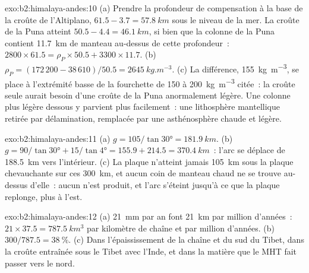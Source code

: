 \begin{solution}{exo:b2:himalaya-andes:10}
(a) Prendre la profondeur de compensation à la
base de la croûte de l'Altiplano, $61.5 - 3.7 =
\qty{57.8}{km}$ sous le niveau de la mer. La croûte de la Puna atteint $50.5 - 4.4 = \qty{46.1}{km}$, si bien
que la colonne de la Puna contient \qty{11.7}{km} de manteau au-dessus de cette profondeur~: $2800\times61.5 =
\rho_P\times50.5 + 3300\times11.7$. (b) $\rho_P = (172\,200 - 38\,610)/50.5 =
\qty{2645}{kg.m^{-3}}$. (c) La différence, \qty{155}{kg.m^{-3}}, se place à l'extrémité basse de la fourchette de 150 à
\qty{200}{kg.m^{-3}} citée~: la croûte seule aurait besoin d'une croûte de la Puna anormalement légère. Une colonne plus légère dessous y
parvient plus facilement~: une lithosphère mantellique retirée par délamination, remplacée par une asthénosphère chaude et légère.
\end{solution}

\begin{solution}{exo:b2:himalaya-andes:11}
(a) $g = 105/\tan\ang{30} = \qty{181.9}{km}$. (b) $g = 90/\tan\ang{30} + 15/\tan\ang{4} =
155.9 + 214.5 = \qty{370.4}{km}$~: l'arc se déplace de \qty{188.5}{km} vers l'intérieur. (c) La plaque n'atteint
jamais \qty{105}{km} sous la plaque chevauchante sur ces \qty{300}{km}, et aucun coin de manteau chaud ne se trouve
au-dessus d'elle~: aucun  n'est produit, et l'arc s'éteint jusqu'à ce que la plaque replonge, plus à l'est.
\end{solution}

\begin{solution}{exo:b2:himalaya-andes:12}
(a) \qty{21}{mm} par an font \qty{21}{km} par million d'années~: $21\times37.5 =
\qty{787.5}{km^3}$ par kilomètre de chaîne et par million d'années. (b) $300/787.5 =
\qty{38}{\percent}$. (c) Dans l'épaississement de la chaîne et du sud du Tibet, dans la croûte
entraînée sous le Tibet avec l'Inde, et dans la matière que le MHT fait passer vers le nord.
\end{solution}

